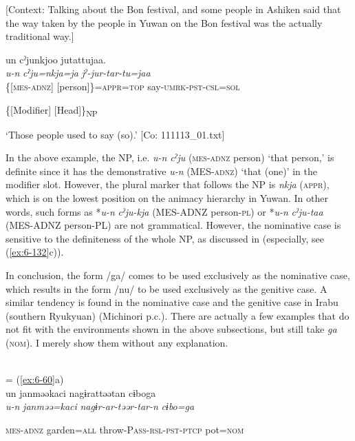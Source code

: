 \begin{table}
\begin{styleBeschriftung}
\ea\label{ex:6-137}
  [Context: Talking about the Bon festival, and some people in Ashiken said that the way taken by the people in Yuwan on the Bon festival was the actually traditional way.]

{\TM}
\glll un  cˀjunkjoo  jutattujaa.\\
\textit{u-n}  \textit{cˀju=nkja=ja}  \textit{jˀ-jur-tar-tu=jaa}\\

    \{[\textsc{mes}-\textsc{adnz}]  [person]\}=\textsc{appr}=\textsc{top}  say-\textsc{umrk}-\textsc{pst}-\textsc{csl}=\textsc{sol}

    \{[Modifier]  [Head]\}\textsubscript{NP}  

\glt    ‘Those people used to say (so).’ [Co: 111113\_01.txt]
\z

In the above example, the NP, i.e. \textit{u-n} \textit{cˀju} (\textsc{mes}-\textsc{adnz} person) ‘that person,’ is definite since it has the demonstrative \textit{u-n} (MES-\textsc{adnz}) ‘that (one)’ in the modifier slot. However, the plural marker that follows the NP is \textit{nkja} (\textsc{appr}), which is on the lowest position on the animacy hierarchy in Yuwan. In other words, such forms as *\textit{u-n} \textit{cˀju-kja} (MES-ADNZ person-\textsc{pl}) or *\textit{u-n} \textit{cˀju-taa} (MES-ADNZ person-PL) are not grammatical. However, the nominative case is sensitive to the definiteness of the whole NP, as discussed in  (especially, see (\ref{ex:6-132}c)).

  In conclusion, the form /ga/ comes to be used exclusively as the nominative case, which results in the form /nu/ to be used exclusively as the genitive case. A similar tendency is found in the nominative case and the genitive case in Irabu (southern Ryukyuan) (Michinori \citealt{Shimoji2013} p.c.). There are actually a few examples that do not fit with the environments shown in the above subsections, but still take \textit{ga} (\textsc{nom}). I merely show them without any explanation.

\ea\label{ex:6-138}
\ea{}\\
\glll = (\ref{ex:6-60}a)\\

{\TM}
\glll un  janməəkaci  nagɨrattəətan  cɨboga\\

      \textit{u-n}  \textit{janməə=kaci}  \textit{nagɨr-ar-təər-tar-n}  \textit{cɨbo=ga}

      \textsc{mes}-\textsc{adnz}  garden=\textsc{all}  throw-P\textsc{ass}-\textsc{rsl}-\textsc{pst}-\textsc{ptcp}  pot=\textsc{nom}


\end{styleBeschriftung}
\end{table}
